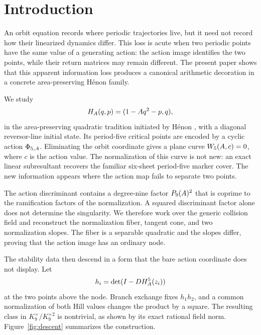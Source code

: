 \section{Introduction}

An orbit equation records where periodic trajectories live, but it need not
record how their linearized dynamics differ.  This loss is acute when two
periodic points have the same value of a generating action: the action image
identifies the two points, while their return matrices may remain different.
The present paper shows that this apparent information loss produces a
canonical arithmetic decoration in a concrete area-preserving H\'enon
family.

We study
\begin{equation}
H_A(q,p)=(1-Aq^2-p,q),                                      \label{eq:map}
\end{equation}
in the area-preserving quadratic tradition initiated by H\'enon
\citep{henon1969},
with a diagonal reversor-line initial state.  Its period-five critical
points are encoded by a cyclic action \(\Phi_{5,A}\).  Eliminating the orbit
coordinate gives a plane curve \(W_5(A,c)=0\), where \(c\) is the action
value.  The normalization of this curve is not new: an exact linear
subresultant recovers the familiar six-sheet period-five marker cover.  The
new information appears where the action map fails to separate two points.

The action discriminant contains a degree-nine factor \(P_9(A)^2\) that is
coprime to the ramification factors of the normalization.  A squared
discriminant factor alone does not determine the singularity.  We therefore
work over the generic collision field and reconstruct the normalization
fiber, tangent cone, and two normalization slopes.  The fiber is a separable
quadratic and the slopes differ, proving that the action image has an
ordinary node.

The stability data then descend in a form that the bare action coordinate
does not display.  Let
\[
h_i=\det(I-DH_A^5(z_i))
\]
at the two points above the node.  Branch exchange fixes \(h_1h_2\), and a
common normalization of both Hill values changes the product by a square.
The resulting class in \(K_9^\times/K_9^{\times2}\) is nontrivial, as shown
by its exact rational field norm.  Figure~\ref{fig:descent} summarizes the
construction.

